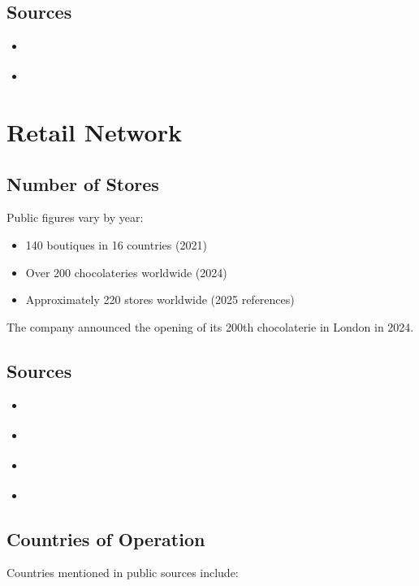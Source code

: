 \subsection*{Sources}

\begin{itemize}
    \item \cite{laderachBestManaged2024}
    \item \cite{wikipediaLaederach}
\end{itemize}

\section{Retail Network}

\subsection{Number of Stores}

Public figures vary by year:

\begin{itemize}
    \item 140 boutiques in 16 countries (2021)
    \item Over 200 chocolateries worldwide (2024)
    \item Approximately 220 stores worldwide (2025 references)
\end{itemize}

The company announced the opening of its 200th chocolaterie in London in 2024.

\subsection*{Sources}

\begin{itemize}
    \item \cite{laderachLeadershipNextGeneration}
    \item \cite{laderachOurBusinessUnits}
    \item \cite{laderachPressReleasesUK}
    \item \cite{wikipediaLaederach}
\end{itemize}

\subsection{Countries of Operation}

Countries mentioned in public sources include:

